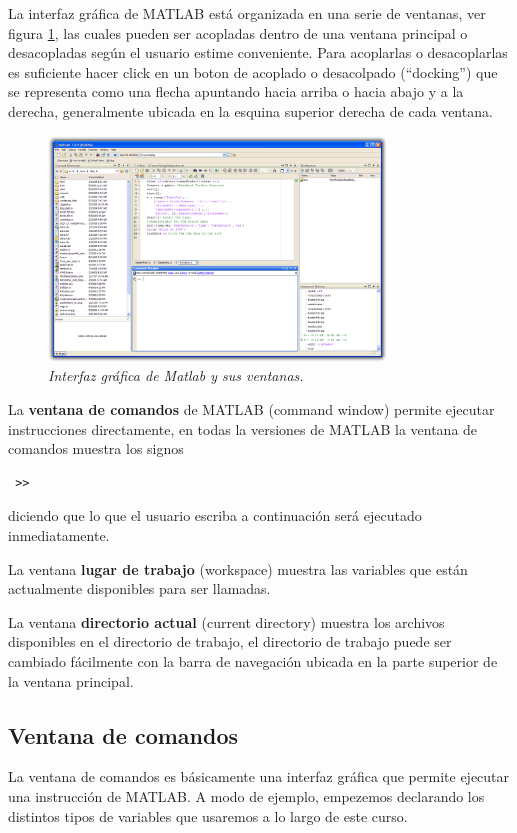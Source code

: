 \documentclass[11pt,legalpaper]{article}
\begin{document}
La interfaz gr\'afica de MATLAB est\'a organizada en una serie de ventanas, ver figura \ref{fig:interfaz}, 
las cuales pueden ser acopladas dentro de una ventana principal o desacopladas seg\'un el usuario estime conveniente. 
Para acoplarlas o desacoplarlas es suficiente hacer click en un boton de acoplado o desacolpado (``docking'') 
que se representa como una flecha apuntando hacia arriba o hacia abajo y a la derecha, generalmente ubicada en la esquina superior derecha de cada ventana.
\begin{figure}[htp]
\begin{center}
\includegraphics[width=0.8\textwidth]{./M2009desktop.png}
\caption{\sl Interfaz gr\'afica de Matlab y sus ventanas.}
\label{fig:interfaz}
\end{center}
\end{figure}

La \textbf{ventana de comandos} de MATLAB (command window) permite ejecutar instrucciones directamente, en todas la versiones de MATLAB la ventana de comandos muestra los signos 
\begin{verbatim}
 >>
\end{verbatim}
diciendo que lo que el usuario escriba a continuaci\'on ser\'a ejecutado 
inmediatamente. 

La ventana \textbf{lugar de trabajo} (workspace) muestra 
las variables que est\'an actualmente disponibles para ser llamadas. 

La ventana \textbf{directorio actual} (current directory) muestra los archivos 
disponibles en el directorio de trabajo, el directorio de trabajo puede ser cambiado f\'acilmente con la 
barra de navegaci\'on ubicada en la parte superior de la ventana principal.

\subsection{Ventana de comandos}
La ventana de comandos es b\'asicamente una interfaz gr\'afica que permite ejecutar una instrucci\'on de MATLAB.
A modo de ejemplo, empezemos declarando los distintos tipos de variables que usaremos a lo largo de este curso.
\end{document}
